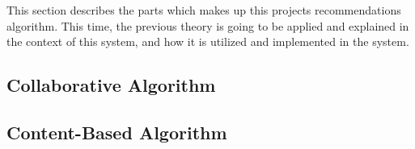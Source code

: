 This section describes the parts which makes up this projects recommendations algorithm. This time, the previous theory is going to be applied and explained in the context of this system, and how it is utilized and implemented in the system.

\subsection{Collaborative Algorithm}
\label{CollaborativeAlg}

\subsection{Content-Based Algorithm}
\label{ContentBasedAlg}

